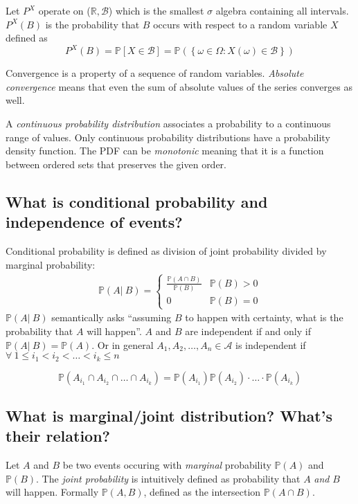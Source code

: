 \documentclass[a4paper]{article}
\newcommand\op[2][P]{\mathbb{#1}\left(#2\right)}
\newcommand\os[2][P]{\mathbb{#1}\left[#2\right]}
\newcommand\cond[3][P]{\mathbb{#1}\left(#2 \left|\:#3\right)\right.}
\newcommand\set[1]{\left\{#1\right\}}
\newcommand\key[1]{\textit{#1}}
\theoremstyle{definition}
\begin{document}
Let $P^X$ operate on ($\mathbb{R}, \mathcal{B}$) which is the smallest $\sigma$ algebra containing all intervals. $P^X(B)$ is the probability that $B$ occurs with respect to a random variable $X$ defined as
\[
  P^X(B) = \os{X \in \mathcal{B}} = \op{\set{\omega \in \Omega: X(\omega) \in \mathcal{B}}}
\]

Convergence is a property of a sequence of random variables. \key{Absolute convergence} means that even the sum of absolute values of the series converges as well.

A \key{continuous probability distribution} associates a probability to a continuous range of values. Only continuous probability distributions have a probability density function. The PDF can be \key{monotonic} meaning that it is a function between ordered sets that preserves the given order.

\subsection{What is conditional probability and independence of events?}
%
Conditional probability is defined as division of joint probability divided by marginal probability:
\begin{align}
  \cond AB = \begin{cases}
    \frac{\op{A \cap B}}{\op{B}}  & \op{B} > 0 \\
    0                                 & \op{B} = 0
  \end{cases}
\end{align}
$\cond AB$ semantically asks \enquote{assuming $B$ to happen with certainty, what is the probability that $A$ will happen}.
$A$ and $B$ are independent if and only if $\cond AB = \op{A}$. Or in general $A_1, A_2, \ldots, A_n \in \mathcal{A}$ is independent if $\forall\: 1 \leq i_1 < i_2 < \ldots < i_k \leq n$

\[
  \op{A_{i_1} \cap A_{i_2} \cap \ldots \cap A_{i_k}}
  = \op{A_{i_1}} \op{A_{i_2}} \cdot \ldots \cdot \op{A_{i_k}}
\]

\subsection{What is marginal/joint distribution? What's their relation?}
%
Let $A$ and $B$ be two events occuring with \key{marginal} probability $\op{A}$ and $\op{B}$. The \key{joint probability} is intuitively defined as probability that $A$ \emph{and} $B$ will happen. Formally $\op{A, B}$, defined as the intersection $\op{A \cap B}$.
\end{document}
